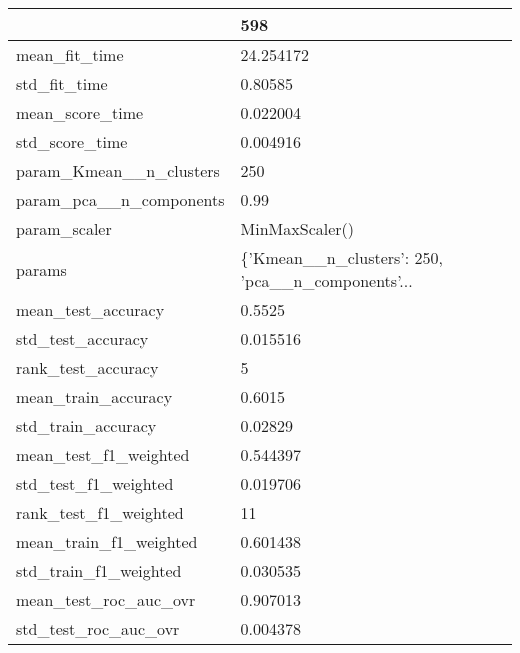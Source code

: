 \begin{tabular}{ll}
\toprule
{} &                                                598 \\
\midrule
mean\_fit\_time               &                                          24.254172 \\
std\_fit\_time                &                                            0.80585 \\
mean\_score\_time             &                                           0.022004 \\
std\_score\_time              &                                           0.004916 \\
param\_Kmean\_\_n\_clusters     &                                                250 \\
param\_pca\_\_n\_components     &                                               0.99 \\
param\_scaler                &                                     MinMaxScaler() \\
params                      &  \{'Kmean\_\_n\_clusters': 250, 'pca\_\_n\_components'... \\
mean\_test\_accuracy          &                                             0.5525 \\
std\_test\_accuracy           &                                           0.015516 \\
rank\_test\_accuracy          &                                                  5 \\
mean\_train\_accuracy         &                                             0.6015 \\
std\_train\_accuracy          &                                            0.02829 \\
mean\_test\_f1\_weighted       &                                           0.544397 \\
std\_test\_f1\_weighted        &                                           0.019706 \\
rank\_test\_f1\_weighted       &                                                 11 \\
mean\_train\_f1\_weighted      &                                           0.601438 \\
std\_train\_f1\_weighted       &                                           0.030535 \\
mean\_test\_roc\_auc\_ovr       &                                           0.907013 \\
std\_test\_roc\_auc\_ovr        &                                           0.004378 \\

\end{tabular}
